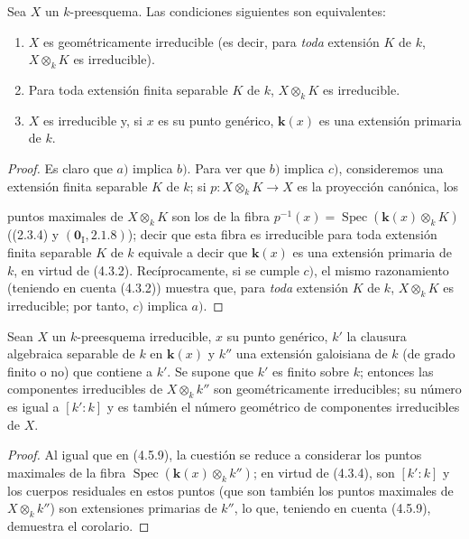 \begin{proposition}[4.5.9]
\label{IV.2.4.5.9-fr}
Sea $X$ un $k$-preesquema. Las condiciones siguientes son equivalentes:
\begin{enumerate}
\item[\textup{a)}] $X$ es geométricamente irreducible \textup{(es decir, para \emph{toda}
extensión $K$ de $k$, $X\otimes_k K$ es irreducible)}.
\item[\textup{b)}] Para toda extensión finita separable $K$ de $k$, $X\otimes_k K$
es irreducible.
\item[\textup{c)}] $X$ es irreducible y, si $x$ es su punto genérico, $\boldsymbol{k}(x)$ es una
extensión primaria de $k$.
\end{enumerate}
\end{proposition}

\begin{proof}
Es claro que $a)$ implica $b)$. Para ver que $b)$ implica $c)$, consideremos
una extensión finita separable $K$ de $k$; si $p:X\otimes_k K\to X$ es la
proyección canónica, los


puntos maximales de $X\otimes_k K$ son los de la fibra
$p^{-1}(x)=\operatorname{Spec}(\boldsymbol{k}(x)\otimes_k K)$ ((2.3.4) y
$(\mathbf{0}_{\mathrm I},2.1.8)$); decir que esta fibra es irreducible para toda
extensión finita separable $K$ de $k$ equivale a decir que $\boldsymbol{k}(x)$ es una
extensión primaria de $k$, en virtud de (4.3.2). Recíprocamente, si se cumple
$c)$, el mismo razonamiento (teniendo en cuenta (4.3.2)) muestra que, para \emph{toda}
extensión $K$ de $k$, $X\otimes_k K$ es irreducible; por tanto, $c)$ implica
$a)$.
\end{proof}

\begin{corollary}[4.5.10]
\label{IV.2.4.5.10-fr}
Sean $X$ un $k$-preesquema irreducible, $x$ su punto genérico, $k'$ la
clausura algebraica separable de $k$ en $\boldsymbol{k}(x)$ y $k''$ una extensión
galoisiana de $k$ (de grado finito o no) que contiene a $k'$. Se supone que
$k'$ es finito sobre $k$; entonces las componentes irreducibles de
$X\otimes_k k''$ son geométricamente irreducibles; su número es igual a
$[k':k]$ y es también el número geométrico de componentes irreducibles de
$X$.
\end{corollary}

\begin{proof}
Al igual que en (4.5.9), la cuestión se reduce a considerar los puntos maximales de la
fibra $\operatorname{Spec}(\boldsymbol{k}(x)\otimes_k k'')$; en virtud de (4.3.4), son
$[k':k]$ y los cuerpos residuales en estos puntos (que son también los puntos
maximales de $X\otimes_k k''$) son extensiones primarias de $k''$, lo que,
teniendo en cuenta (4.5.9), demuestra el corolario.
\end{proof}


